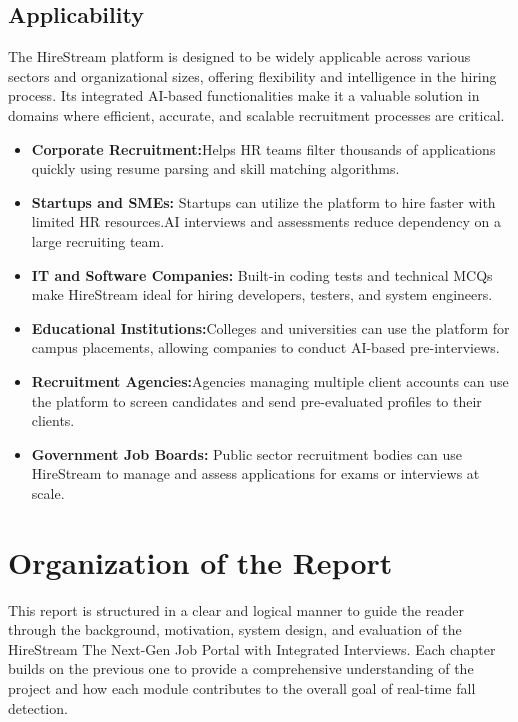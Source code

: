 \documentclass[a4paper, 12pt]{report}
\begin{document}
\subsection{Applicability}
The HireStream platform is designed to be widely applicable across various sectors and organizational sizes, offering flexibility and intelligence in the hiring process. Its integrated AI-based functionalities make it a valuable solution in domains where efficient, accurate, and scalable recruitment processes are critical.
\begin{itemize}[itemsep=-4pt]
    \item \textbf{Corporate Recruitment:}Helps HR teams filter thousands of applications quickly using resume parsing and skill matching algorithms.

    \item \textbf{Startups and SMEs: }Startups can utilize the platform to hire faster with limited HR resources.AI interviews and assessments reduce dependency on a large recruiting team.
    
    \item \textbf{IT and Software Companies:} Built-in coding tests and technical MCQs make HireStream ideal for hiring developers, testers, and system engineers.

    \item \textbf{Educational Institutions:}Colleges and universities can use the platform for campus placements, allowing companies to conduct AI-based pre-interviews.

    \item \textbf{Recruitment Agencies:}Agencies managing multiple client accounts can use the platform to screen candidates and send pre-evaluated profiles to their clients.

    \item \textbf{Government Job Boards:} Public sector recruitment bodies can use HireStream to manage and assess applications for exams or interviews at scale.
\end{itemize}


\section{Organization of the Report}
This report is structured in a clear and logical manner to guide the reader through the background, motivation, system design, and evaluation of the HireStream The Next-Gen Job Portal with Integrated Interviews. Each chapter builds on the previous one to provide a comprehensive understanding of the project and how each module contributes to the overall goal of real-time fall detection.
\end{document}
